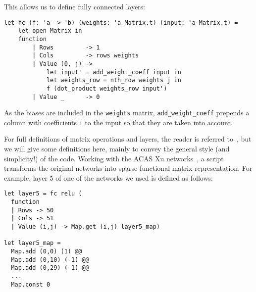 \documentclass[runningheads]{llncs}
\newcommand{\knote}[1]{\todo[inline, color=blue!20]{#1}}
\begin{document}
\noindent This allows us to define fully connected layers:

\begin{lstlisting}
let fc (f: 'a -> 'b) (weights: 'a Matrix.t) (input: 'a Matrix.t) = 
	let open Matrix in
	function
		| Rows         -> 1
		| Cols         -> rows weights
		| Value (0, j) -> 
			let input' = add_weight_coeff input in
			let weights_row = nth_row weights j in
			f (dot_product weights_row input')
		| Value _      -> 0
\end{lstlisting}

\noindent As the biases are included in the \lstinline|weights| matrix, \lstinline|add_weight_coeff| prepends a column with coefficients $1$ to the input so that they are taken into account.

\iffalse
-----------------------

\noindent The only help Imandra needs to prove this automatically -- are the forward-chaining rules about the $relu$ function:


\begin{lstlisting}
	lemma relu_pos x =
	x >= 0 ==> (relu x) [@trigger] = x
	[@@auto] [@@fc]
	
	lemma relu_neg x =
	x <= 0 ==> (relu x) [@trigger] = 0
	[@@auto] [@@fc]
\end{lstlisting}

\noindent And then we disable $relu$ for all of the proofs. This way,
$relu$ induces no simplification case-splits, while all
relevant information about $relu$ values is propagated,
per instance, on demand to our simplification context.
Now Imandra's engine takes care of the proof automatically  (when we use the tactic \lstinline{[@@auto]}), and takes just under 1.5 minutes.
\knote{explain better how auto works}
----------------------
\fi


For full definitions of matrix operations and layers, the reader is referred to~\cite{DPKD22}, but we will give some definitions here, mainly to convey the general style (and simplicity!) of the code.  Working with the ACAS Xu networks~\cite{KaBaDiJuKo17Reluplex}, a script transforms the original networks into sparse functional matrix representation.
For example, layer 5 of one of the networks we used is defined as follows:

\begin{lstlisting}
let layer5 = fc relu (
  function
  | Rows -> 50
  | Cols -> 51
  | Value (i,j) -> Map.get (i,j) layer5_map)

let layer5_map =
  Map.add (0,0) (1) @@
  Map.add (0,10) (-1) @@
  Map.add (0,29) (-1) @@
  ...
  Map.const 0
\end{lstlisting}
\end{document}
